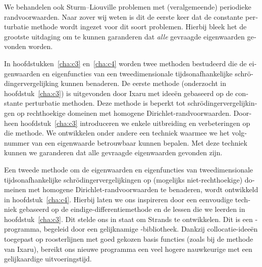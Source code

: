 \begin{otherlanguage}{dutch}
We behandelen ook Sturm--Liouville problemen met (veralgemeende) periodieke randvoorwaarden. Naar zover wij weten is dit de eerste keer dat de constante perturbatie methode wordt ingezet voor dit soort problemen. Hierbij bleek het de grootste uitdaging om te kunnen garanderen dat \emph{alle} gevraagde eigenwaarden gevonden worden.

In hoofdstukken~\ref{cha:c3} en~\ref{cha:c4} worden twee methoden bestudeerd die de eigenwaarden en eigenfuncties van een tweedimensionale tijdsonafhankelijke schrödingervergelijking kunnen benaderen. De eerste methode (onderzocht in hoofdstuk~\ref{cha:c3}) is uitgevonden door Ixaru met ideeën gebaseerd op de constante perturbatie methoden. Deze methode is beperkt tot schrödingervergelijkingen op rechthoekige domeinen met homogene Dirichlet-randvoorwaarden. Doorheen hoofdstuk~\ref{cha:c3} introduceren we enkele uitbreiding en verbeteringen op die methode. We ontwikkelen onder andere een techniek waarmee we het volgnummer van een eigenwaarde betrouwbaar kunnen bepalen. Met deze techniek kunnen we garanderen dat alle gevraagde eigenwaarden gevonden zijn.

Een tweede methode om de eigenwaarden en eigenfuncties van tweedimensionale tijdsonafhankelijke schrödingervergelijkingen op (mogelijks niet-rechthoekige) domeinen met homogene Dirichlet-randvoorwaarden te benaderen, wordt ontwikkeld in hoofdstuk~\ref{cha:c4}. Hierbij laten we ons inspireren door een eenvoudige techniek gebaseerd op de eindige-differentiemethode en de lessen die we leerden in hoofdstuk~\ref{cha:c3}. Dit stelde ons in staat om Strands te ontwikkelen. Dit is een \cpp{}-programma, begeleid door een gelijknamige \lpython{}-bibliotheek. Dankzij collocatie-ideeën toegepast op roosterlijnen met goed gekozen basis functies (zoals bij de methode van Ixaru), bereikt ons nieuwe programma een veel hogere nauwkeurige met een gelijkaardige uitvoeringstijd. 

\end{otherlanguage}

\stopchapter
